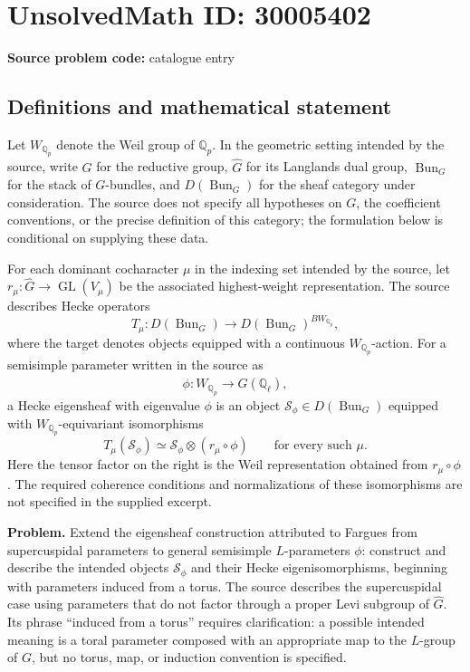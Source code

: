\documentclass[11pt]{article}
\newcommand{\Q}{\mathbb{Q}}
\begin{document}
\section*{UnsolvedMath ID: 30005402}
\textbf{Source problem code:} catalogue entry
\subsection{Definitions and mathematical statement}
Let \(W_{\Q_p}\) denote the Weil group of \(\Q_p\). In the geometric setting intended by the source, write \(G\) for the reductive group, \(\widehat G\) for its Langlands dual group, \(\operatorname{Bun}_G\) for the stack of \(G\)-bundles, and \(D(\operatorname{Bun}_G)\) for the sheaf category under consideration. The source does not specify all hypotheses on \(G\), the coefficient conventions, or the precise definition of this category; the formulation below is conditional on supplying these data.

For each dominant cocharacter \(\mu\) in the indexing set intended by the source, let \(r_\mu\colon\widehat G\to\operatorname{GL}(V_\mu)\) be the associated highest-weight representation. The source describes Hecke operators
\[
T_\mu\colon D(\operatorname{Bun}_G)\longrightarrow D(\operatorname{Bun}_G)^{B W_{\Q_p}},
\]
where the target denotes objects equipped with a continuous \(W_{\Q_p}\)-action. For a semisimple parameter written in the source as
\[
\phi\colon W_{\Q_p}\longrightarrow\widehat G(\Q_\ell),
\]
a Hecke eigensheaf with eigenvalue \(\phi\) is an object \(\mathcal S_\phi\in D(\operatorname{Bun}_G)\) equipped with \(W_{\Q_p}\)-equivariant isomorphisms
\[
T_\mu(\mathcal S_\phi)\simeq
\mathcal S_\phi\otimes (r_\mu\circ\phi)
\qquad\text{for every such }\mu.
\]
Here the tensor factor on the right is the Weil representation obtained from \(r_\mu\circ\phi\). The required coherence conditions and normalizations of these isomorphisms are not specified in the supplied excerpt.

\textbf{Problem.} Extend the eigensheaf construction attributed to Fargues from supercuspidal parameters to general semisimple \(L\)-parameters \(\phi\): construct and describe the intended objects \(\mathcal S_\phi\) and their Hecke eigenisomorphisms, beginning with parameters induced from a torus. The source describes the supercuspidal case using parameters that do not factor through a proper Levi subgroup of \(\widehat G\). Its phrase ``induced from a torus'' requires clarification: a possible intended meaning is a toral parameter composed with an appropriate map to the \(L\)-group of \(G\), but no torus, map, or induction convention is specified.
\end{document}
